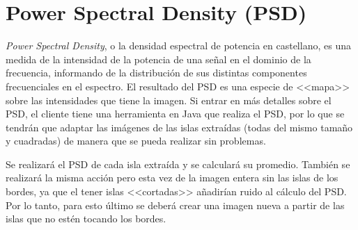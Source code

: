 \section{Power Spectral Density (PSD)}

\textit{Power Spectral Density}, o la densidad espectral de potencia en castellano, es una medida de la intensidad de la potencia de una se\~{n}al en el dominio de la frecuencia, informando de la distribuci\'{o}n de sus distintas componentes frecuenciales en el espectro. El resultado del PSD es una especie de <<mapa>> sobre las intensidades que tiene la imagen. Si entrar en m\'{a}s detalles sobre el PSD, el cliente tiene una herramienta en Java que realiza el PSD, por lo que se tendr\'{a}n que adaptar las im\'{a}genes de las islas extra\'{i}das (todas del mismo tama\~{n}o y cuadradas) de manera que se pueda realizar sin problemas.

Se realizar\'{a} el PSD de cada isla extra\'{i}da y se calcular\'{a} su promedio. Tambi\'{e}n se realizar\'{a} la misma acci\'{o}n pero esta vez de la imagen entera sin las islas de los bordes, ya que el tener islas <<cortadas>> a\~{n}adir\'{i}an ruido al c\'{a}lculo del PSD. Por lo tanto, para esto \'{u}ltimo se deber\'{a} crear una imagen nueva a partir de las islas que no est\'{e}n tocando los bordes.
